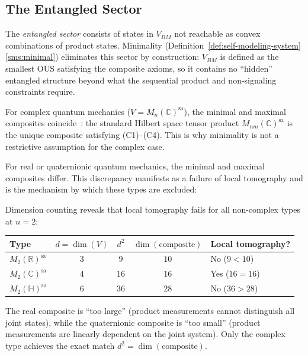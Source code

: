 \subsection{The Entangled Sector}\label{subsec:entangled}

The \emph{entangled sector} consists of states in $V_{BM}$ not reachable
as convex combinations of product states. Minimality
(Definition~\ref{def:self-modeling-system}\ref{sms:minimal}) eliminates this sector by
construction: $V_{BM}$ is defined as the smallest OUS satisfying the
composite axioms, so it contains no ``hidden'' entangled structure beyond
what the sequential product and non-signaling constraints require.

For complex quantum mechanics ($V = M_n(\mathbb{C})^{\mathrm{sa}}$),
the minimal and maximal composites
coincide~\cite{Barnum2023}: the standard Hilbert space
tensor product $M_{nm}(\mathbb{C})^{\mathrm{sa}}$ is the unique composite
satisfying (C1)--(C4). This is why minimality is not a restrictive
assumption for the complex case.

For real or quaternionic quantum mechanics, the minimal and maximal
composites differ. This discrepancy manifests as a failure of local
tomography and is the mechanism by which these types are excluded:

\begin{remark}\label{rem:negative-checks}
Dimension counting reveals that local tomography fails for all
non-complex types at $n=2$:
\begin{center}
\begin{tabular}{lcccl}
\toprule
Type & $d = \dim(V)$ & $d^2$ & $\dim(\text{composite})$
& Local tomography? \\
\midrule
$M_2(\mathbb{R})^{\mathrm{sa}}$ & $3$ & $9$ & $10$ & No\; ($9 < 10$) \\
$M_2(\mathbb{C})^{\mathrm{sa}}$ & $4$ & $16$ & $16$ & Yes\; ($16 = 16$)\\
$M_2(\mathbb{H})^{\mathrm{sa}}$ & $6$ & $36$ & $28$ & No\; ($36 > 28$)\\
\bottomrule
\end{tabular}
\end{center}
The real composite is ``too large'' (product measurements cannot
distinguish all joint states), while the quaternionic composite is ``too
small'' (product measurements are linearly dependent on the joint system).
Only the complex type achieves the exact match $d^2 =
\dim(\text{composite})$.
\end{remark}
